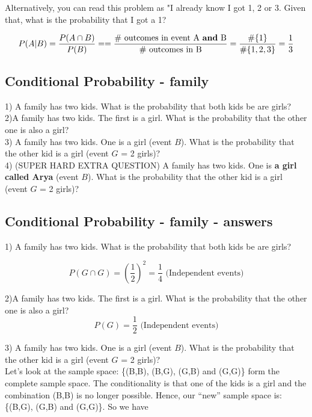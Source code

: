 \documentclass[11pt]{article}
\begin{document}
	Alternatively, 	you can read this problem as "I already know I got 1, 2 or 3. Given that, what is the probability that I got a 1?

	
	\[P(A|B) = \frac{P(A\cap B)}{P(B)} = 		=\frac{\text{\# outcomes in event A \textbf{and} B}}
							{\text{\# outcomes in B}
							} = 
							\frac{\#\{1\}}{\#\{1,2,3\}}= 
							\frac{1}{3}\] 	 


	\subsection*{Conditional Probability - family}
	1) A family has two kids. What is the probability that both kids be are girls?\\
	
	2)A family has two kids. The first is a girl. What is the probability that the other one is also a girl?\\
	
	3) A family has two kids. One is a girl (event $B$). What is the probability that the other kid is a girl (event $G$ = 2 girls)?\\

	4) (SUPER HARD EXTRA QUESTION) A family has two kids. One is \textbf{a girl called Arya} (event $B$). What is the probability that the other kid is a girl (event $G$ = 2 girls)?


	\subsection*{Conditional Probability - family - answers}
	1) A family has two kids. What is the probability that both kids be are girls?

	\[P(G \cap G) = \left(\frac{1}{2}\right)^2 = \frac{1}{4} \text{ (Independent events)}\]
	
	2)A family has two kids. The first is a girl. What is the probability that the other one is also a girl?\\

	\[P(G) = \frac{1}{2}\text{ (Independent events)}\]

	3) A family has two kids. One is a girl (event $B$). What is the probability that the other kid is a girl (event $G$ = 2 girls)?\\
	
	Let's look at the sample space: \{(B,B), (B,G), (G,B) and (G,G)\} form the complete sample space. The conditionality is that one of the kids is a girl and the combination (B,B) is no longer possible. Hence, our ``new'' sample space is: \{(B,G), (G,B) and (G,G)\}. So we have
	
\end{document}
